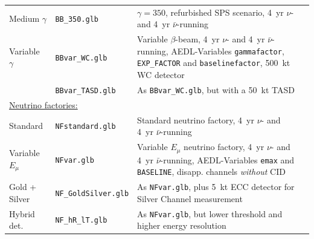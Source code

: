 \begin{table}[tbp]
\begin{center}
{\begin{tabular}{llp{7.1cm}c}
Medium $\gamma$ & {\tt BB\_350.glb} & $\gamma=350$, refurbished SPS scenario, 4~yr $\nu$- and
4~yr $\bar{\nu}$-running & \cite{Burguet-Castell:2005pa} \\[0.2cm]

Variable $\gamma$ & {\tt BBvar\_WC.glb} & Variable $\beta$-beam, 4~yr $\nu$- and 
4~yr $\bar{\nu}$-running, {\sf AEDL}-Variables {\tt gammafactor}, 
{\tt EXP\_FACTOR} and {\tt baselinefactor}, 500~kt WC detector & \cite{Huber:2005jk} \\[0.2cm]

	& {\tt BBvar\_TASD.glb} & As {\tt BBvar\_WC.glb}, but with a 50~kt TASD
& \cite{Huber:2005jk} \\[0.2cm]

\multicolumn{4}{l}{\underline{Neutrino factories:}} \\[0.2cm]

Standard & {\tt NFstandard.glb} & Standard neutrino factory, 
4~yr $\nu$- and 4~yr $\bar{\nu}$-running & \cite{Huber:2002mx} \\[0.2cm]

Variable $E_\mu$ & {\tt NFvar.glb} & Variable $E_\mu$ neutrino factory, 4~yr 
$\nu$- and 4~yr $\bar{\nu}$-running, {\sf AEDL}-Variables {\tt emax} and {\tt BASELINE}, disapp. channels
{\em without} CID & \cite{Huber:2002mx,Huber:2006wb}  \\[0.2cm]

Gold + Silver & {\tt NF\_GoldSilver.glb} & As {\tt NFvar.glb}, 
plus 5~kt ECC detector for Silver Channel
measurement & \cite{Huber:2002mx,Huber:2006wb,Autiero:2003fu} \\[0.2cm]

Hybrid det. & {\tt NF\_hR\_lT.glb} & As {\tt NFvar.glb}, 
but lower threshold and higher energy resolution & \cite{Huber:2002mx,Huber:2006wb} \\[0.2cm]


\end{tabular}}
\end{center}
\end{table}
